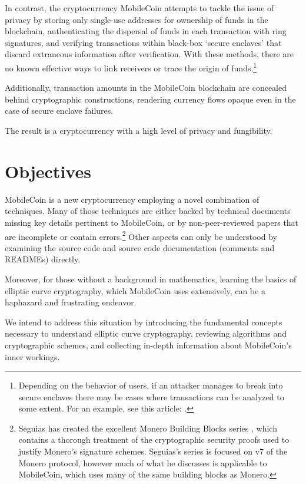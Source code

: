 In contrast, the cryptocurrency MobileCoin attempts to tackle the issue of privacy by storing only single-use addresses for ownership of funds in the blockchain, authenticating the dispersal of funds in each transaction with ring signatures, and verifying transactions within black-box `secure enclaves' that discard extraneous information after verification. With these methods, there are no known effective ways to link receivers or trace the origin of funds.\footnote{Depending on the behavior of users, if an attacker manages to break into secure enclaves there may be cases where transactions can be analyzed to some extent. For an example, see this article: \cite{monero-ring-heuristics-ryo}.}

Additionally, transaction amounts in the MobileCoin blockchain are concealed behind cryptographic constructions, rendering currency flows opaque even in the case of secure enclave failures.

The result is a cryptocurrency with a high level of privacy and fungibility.



\section{Objectives}
\label{sec:goals}

MobileCoin is a new cryptocurrency employing a novel combination of techniques. Many of those techniques are either backed by technical documents missing key details pertinent to MobileCoin, or by non-peer-reviewed papers that are incomplete or contain errors.\footnote{Seguias has created the excellent Monero Building Blocks series \cite{monero-building-blocks}, which contains a thorough treatment of the cryptographic security proofs used to justify Monero's signature schemes. Seguias's series is focused on v7 of the Monero protocol, however much of what he discusses is applicable to MobileCoin, which uses many of the same building blocks as Monero.} Other aspects can only be understood by examining the source code and source code documentation (comments and READMEs) directly.

Moreover, for those without a background in mathematics, learning the basics of elliptic curve cryptography, which MobileCoin uses extensively, can be a haphazard and frustrating endeavor.

We intend to address this situation by introducing the fundamental concepts necessary to understand elliptic curve cryptography, reviewing algorithms and cryptographic schemes, and collecting in-depth information about MobileCoin’s inner workings.

